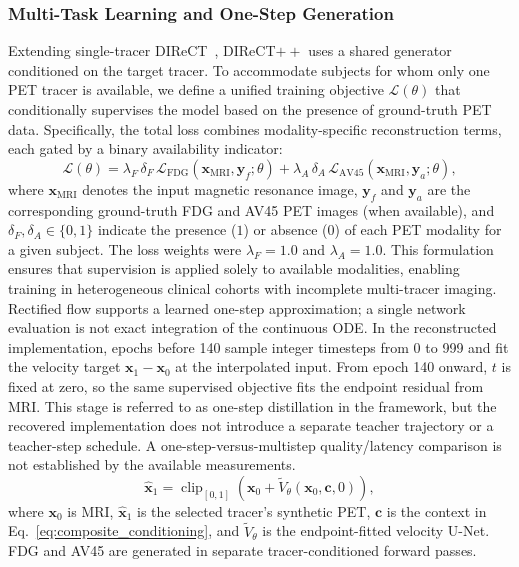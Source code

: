 \documentclass{article}
\begin{document}
\subsubsection{Multi-Task Learning and One-Step Generation}
Extending single-tracer DIReCT~\cite{liu2025direct}, DIReCT$++$ uses a shared generator conditioned on the target tracer. To accommodate subjects for whom only one PET tracer is available, we define a unified training objective $\mathcal{L}(\theta)$ that conditionally supervises the model based on the presence of ground-truth PET data. Specifically, the total loss combines modality-specific reconstruction terms, each gated by a binary availability indicator:
\begin{equation}
\mathcal{L}(\theta) = \lambda_F \, \delta_F \, \mathcal{L}_{\text{FDG}}(\mathbf{x}_{\text{MRI}}, \mathbf{y}_f; \theta) + \lambda_A \, \delta_A \, \mathcal{L}_{\text{AV45}}(\mathbf{x}_{\text{MRI}}, \mathbf{y}_a; \theta),
\label{eq:multitask_loss}
\end{equation}
where $\mathbf{x}_{\text{MRI}}$ denotes the input magnetic resonance image, $\mathbf{y}_f$ and $\mathbf{y}_a$ are the corresponding ground-truth FDG and AV45 PET images (when available), and $\delta_F, \delta_A \in \{0,1\}$ indicate the presence ($1$) or absence ($0$) of each PET modality for a given subject. The loss weights were $\lambda_F=1.0$ and $\lambda_A=1.0$. This formulation ensures that supervision is applied solely to available modalities, enabling training in heterogeneous clinical cohorts with incomplete multi-tracer imaging.
Rectified flow supports a learned one-step approximation; a single network evaluation is not exact integration of the continuous ODE. In the reconstructed implementation, epochs before 140 sample integer timesteps from 0 to 999 and fit the velocity target $\mathbf{x}_1-\mathbf{x}_0$ at the interpolated input. From epoch 140 onward, $t$ is fixed at zero, so the same supervised objective fits the endpoint residual from MRI. This stage is referred to as one-step distillation in the framework, but the recovered implementation does not introduce a separate teacher trajectory or a teacher-step schedule. A one-step-versus-multistep quality/latency comparison is not established by the available measurements.
\begin{equation}
\widehat{\mathbf{x}}_1=\operatorname{clip}_{[0,1]}\!\left(\mathbf{x}_0+\widetilde{V}_\theta(\mathbf{x}_0,\mathbf{c},0)\right),
\label{eq:onestep_generation}
\end{equation}
where $\mathbf{x}_0$ is MRI, $\widehat{\mathbf{x}}_1$ is the selected tracer's synthetic PET, $\mathbf{c}$ is the context in Eq.~\eqref{eq:composite_conditioning}, and $\widetilde{V}_\theta$ is the endpoint-fitted velocity U-Net. FDG and AV45 are generated in separate tracer-conditioned forward passes.
\end{document}
